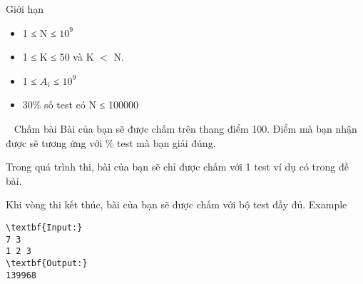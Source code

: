 Giới hạn
\begin{itemize}
	\item 1 ≤ N ≤ $10^{9}$
	\item 1 ≤ K ≤ 50 và K $<$ N.
	\item 1 ≤ $A_{i}$ ≤ $10^{9}$
	\item 30\% số test có N ≤ 100000
\end{itemize}

 
Chấm bài
Bài của bạn sẽ được chấm trên thang điểm 100. Điểm mà bạn nhận được sẽ tương ứng với \% test mà bạn giải đúng.

Trong quá trình thi, bài của bạn sẽ chỉ được chấm với 1 test ví dụ có trong đề bài.

Khi vòng thi kết thúc, bài của bạn sẽ được chấm với bộ test đầy đủ.
Example
\begin{verbatim}
\textbf{Input:}
7 3
1 2 3
\textbf{Output:}
139968\end{verbatim}